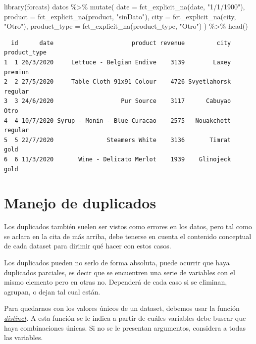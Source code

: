 \documentclass[
  letterpaper,
  DIV=11,
  numbers=noendperiod]{scrreprt}
\newenvironment{Shaded}{\begin{snugshade}}{\end{snugshade}}
\newcommand{\AttributeTok}[1]{\textcolor[rgb]{0.40,0.45,0.13}{#1}}
\newcommand{\FunctionTok}[1]{\textcolor[rgb]{0.28,0.35,0.67}{#1}}
\newcommand{\NormalTok}[1]{\textcolor[rgb]{0.00,0.23,0.31}{#1}}
\newcommand{\SpecialCharTok}[1]{\textcolor[rgb]{0.37,0.37,0.37}{#1}}
\newcommand{\StringTok}[1]{\textcolor[rgb]{0.13,0.47,0.30}{#1}}
\begin{document}
\begin{Shaded}
\begin{Highlighting}[]
\FunctionTok{library}\NormalTok{(forcats)}
\NormalTok{datos }\SpecialCharTok{\%\textgreater{}\%} 
  \FunctionTok{mutate}\NormalTok{(}
  \AttributeTok{date =} \FunctionTok{fct\_explicit\_na}\NormalTok{(date, }\StringTok{"1/1/1900"}\NormalTok{),}
  \AttributeTok{product =} \FunctionTok{fct\_explicit\_na}\NormalTok{(product, }\StringTok{"sinDato"}\NormalTok{),}
  \AttributeTok{city =} \FunctionTok{fct\_explicit\_na}\NormalTok{(city, }\StringTok{"Otro"}\NormalTok{),}
  \AttributeTok{product\_type =} \FunctionTok{fct\_explicit\_na}\NormalTok{(product\_type, }\StringTok{"Otro"}\NormalTok{) ) }\SpecialCharTok{\%\textgreater{}\%} 
  \FunctionTok{head}\NormalTok{()}
\end{Highlighting}
\end{Shaded}

\begin{verbatim}
  id      date                      product revenue         city product_type
1  1 26/3/2020     Lettuce - Belgian Endive    3139        Laxey      premiun
2  2 27/5/2020     Table Cloth 91x91 Colour    4726 Svyetlahorsk      regular
3  3 24/6/2020                   Pur Source    3117      Cabuyao         Otro
4  4 10/7/2020 Syrup - Monin - Blue Curacao    2575   Nouakchott      regular
5  5 22/7/2020               Steamers White    3136       Timrat         gold
6  6 11/3/2020       Wine - Delicato Merlot    1939    Glinojeck         gold
\end{verbatim}

\hypertarget{manejo-de-duplicados}{%
\section{Manejo de duplicados}\label{manejo-de-duplicados}}

Los duplicados también suelen ser vistos como errores en los datos, pero
tal como se aclara en la cita de más arriba, debe tenerse en cuenta el
contenido conceptual de cada dataset para dirimir qué hacer con estos
casos.

Los duplicados pueden no serlo de forma absoluta, puede ocurrir que haya
duplicados parciales, es decir que se encuentren una serie de variables
con el mismo elemento pero en otras no. Dependerá de cada caso si se
eliminan, agrupan, o dejan tal cual están.

Para quedarnos con los valores únicos de un dataset, debemos usar la
función
\href{https://www.rdocumentation.org/packages/dplyr/versions/0.7.8/topics/distinct}{\emph{distinct}}\emph{.}
A esta función se le indica a partir de cuáles variables debe buscar que
haya combinaciones únicas. Si no se le presentan argumentos, considera a
todas las variables.
\end{document}
